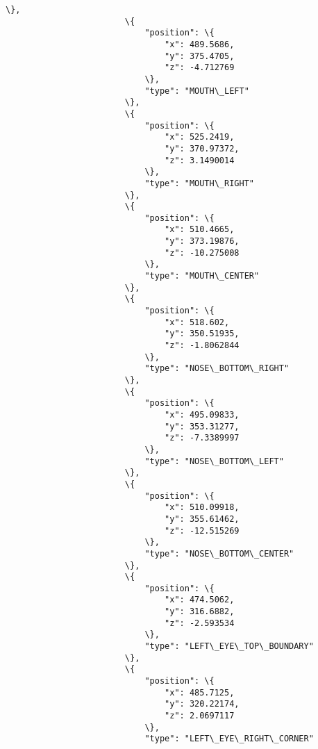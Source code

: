 \documentclass[11pt]{article}
\begin{document}
\begin{Verbatim}[commandchars=\\\{\}]
                        \},
                        \{
                            "position": \{
                                "x": 489.5686,
                                "y": 375.4705,
                                "z": -4.712769
                            \},
                            "type": "MOUTH\_LEFT"
                        \},
                        \{
                            "position": \{
                                "x": 525.2419,
                                "y": 370.97372,
                                "z": 3.1490014
                            \},
                            "type": "MOUTH\_RIGHT"
                        \},
                        \{
                            "position": \{
                                "x": 510.4665,
                                "y": 373.19876,
                                "z": -10.275008
                            \},
                            "type": "MOUTH\_CENTER"
                        \},
                        \{
                            "position": \{
                                "x": 518.602,
                                "y": 350.51935,
                                "z": -1.8062844
                            \},
                            "type": "NOSE\_BOTTOM\_RIGHT"
                        \},
                        \{
                            "position": \{
                                "x": 495.09833,
                                "y": 353.31277,
                                "z": -7.3389997
                            \},
                            "type": "NOSE\_BOTTOM\_LEFT"
                        \},
                        \{
                            "position": \{
                                "x": 510.09918,
                                "y": 355.61462,
                                "z": -12.515269
                            \},
                            "type": "NOSE\_BOTTOM\_CENTER"
                        \},
                        \{
                            "position": \{
                                "x": 474.5062,
                                "y": 316.6882,
                                "z": -2.593534
                            \},
                            "type": "LEFT\_EYE\_TOP\_BOUNDARY"
                        \},
                        \{
                            "position": \{
                                "x": 485.7125,
                                "y": 320.22174,
                                "z": 2.0697117
                            \},
                            "type": "LEFT\_EYE\_RIGHT\_CORNER"

\end{Verbatim}
\end{document}
